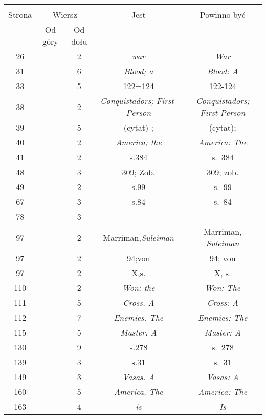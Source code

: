 \documentclass[a4paper,11pt]{article}
\begin{document}
\begin{center}

  \begin{tabular}{|c|c|c|c|c|}
    \hline
    & \multicolumn{2}{c|}{} & & \\
    Strona & \multicolumn{2}{c|}{Wiersz} & Jest
                              & Powinno być \\ \cline{2-3}
    & Od góry & Od dołu & & \\
    \hline
    26  & &  2 & \textit{war} & \textit{War} \\
    31  & &  6 & \textit{Blood; a} & \textit{Blood: A} \\
    33  & &  5 & 122=124 & 122-124 \\
    38  & &  2 & \textit{Conquistadors; First-Person}
           & \textit{Conquistadors; First-Person} \\
    39  & &  5 & (cytat) ; & (cytat); \\
    40  & &  2 & \textit{America; the} & \textit{America: The} \\
    41  & &  2 & s.384 & s.~384 \\
    48  & &  3 & 309; Zob. & 309; zob. \\
    49  & &  2 & s.99 & s.~99 \\
    67  & &  3 & s.84 & s.~84 \\
    78  & &  3 & & \\
    97  & &  2 & Marriman,\textit{Suleiman} & Marriman, \textit{Suleiman} \\
    97  & &  2 & 94;von & 94; von\\
    97  & &  2 & X,s.& X, s. \\
    110 & &  2 & \textit{Won; the} & \textit{Won: The} \\
    111 & &  5 & \textit{Cross. A} & \textit{Cross: A} \\
    112 & &  7 & \textit{Enemies. The} & \textit{Enemies: The} \\
    115 & &  5 & \textit{Master. A} & \textit{Master: A} \\
    130 & &  9 & s.278 & s.~278 \\
    139 & &  3 & s.31 & s.~31 \\
    149 & &  3 & \textit{Vasas. A} & \textit{Vasas: A} \\
    160 & &  5 & \textit{America. The} & \textit{America: The} \\
    163 & &  4 & \textit{is} & \textit{Is} \\

\end{tabular}
\end{center}
\end{document}
